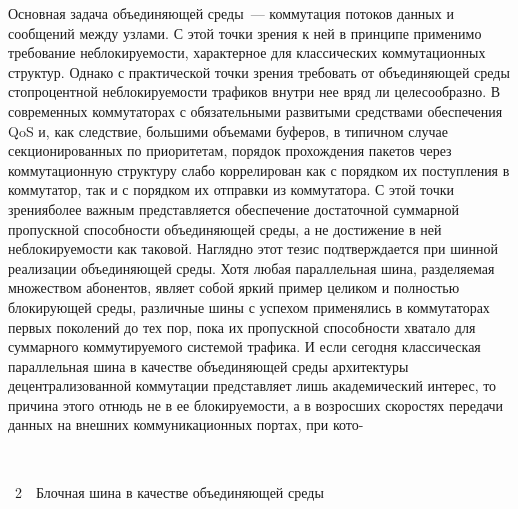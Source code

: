 \begin{multicols}{2}
     Основная задача объединяющей среды~--- коммутация потоков данных и сообщений 
между узлами. С этой точки зрения к ней в принципе применимо требование 
не\-бло\-ки\-ру\-емости, характерное для классических коммутационных структур. Однако с 
практической точки зрения требовать от объединяющей среды стопроцентной 
не\-бло\-ки\-ру\-емости трафиков внутри нее вряд ли целесообразно. В современных коммутаторах 
с обязательными развитыми средствами обеспечения QoS и, как следствие, большими 
объемами буферов, в типичном случае секционированных по приоритетам, порядок 
прохождения пакетов через коммутационную структуру слабо коррелирован как с порядком 
их\linebreak
поступления в коммутатор, так и с порядком их\linebreak
 отправки из коммутатора. С этой точки 
зрения\linebreak более важным представляется обеспечение достаточной суммарной пропускной 
способности объеди\-ня\-ющей среды, а не достижение в ней не\-бло\-ки\-ру\-емости как таковой. 
Наглядно этот тезис подтверждается при шинной реализации объединяющей среды. Хотя 
любая параллельная шина, разделяемая множеством абонентов, являет собой яркий пример 
целиком и полностью блокирующей среды, различные шины с успехом применялись в 
коммутаторах первых поколений до тех пор, пока их пропускной способности хватало для 
суммарного коммутируемого системой трафика. И если сегодня классическая параллельная 
шина в качестве объединяющей среды архитектуры децентрализованной коммутации 
представляет лишь академический интерес, то причина этого отнюдь не в ее блокируемости, 
а в возросших скоростях передачи данных на внешних коммуникационных портах, при 
кото-\linebreak\vspace*{-12pt}

\pagebreak 

\begin{center}
\vspace*{1pt}
\mbox{%
\epsfxsize=64.267mm
}
\end{center}
{{\figurename~2}\ \ \small{Блочная шина в качестве объединяющей среды}}

\bigskip
\addtocounter{figure}{1}




\end{multicols}
